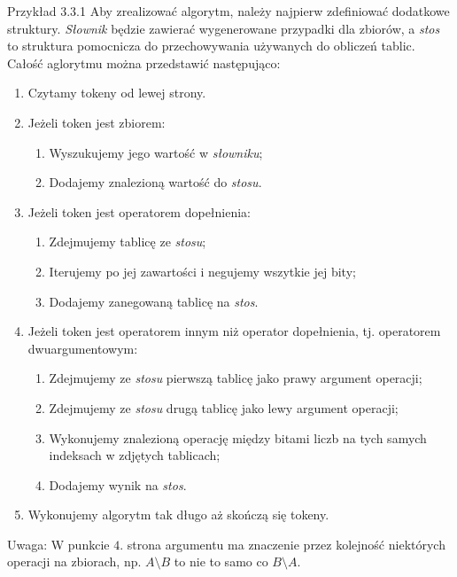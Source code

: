 \documentclass{SGGW-thesis}
\begin{document}
\begin{paragraph}{Przykład 3.3.1\label{ex:3.3.1}}
    Aby zrealizować algorytm, należy najpierw zdefiniować dodatkowe struktury. \emph{Słownik} będzie zawierać wygenerowane przypadki dla zbiorów, a \emph{stos} to struktura pomocnicza do przechowywania używanych do obliczeń tablic. Całość aglorytmu można przedstawić następująco:
    \begin{enumerate}
        \item Czytamy tokeny od lewej strony.
        \item Jeżeli token jest zbiorem:
        \begin{enumerate}
            \item Wyszukujemy jego wartość w \emph{słowniku};
            \item Dodajemy znalezioną wartość do \emph{stosu}.
        \end{enumerate}
        \item Jeżeli token jest operatorem dopełnienia:
        \begin{enumerate}
            \item Zdejmujemy tablicę ze \emph{stosu};
            \item Iterujemy po jej zawartości i negujemy wszytkie jej bity;
            \item Dodajemy zanegowaną tablicę na \emph{stos}.
        \end{enumerate}
        \item Jeżeli token jest operatorem innym niż operator dopełnienia, tj. operatorem dwuargumentowym:
        \begin{enumerate}
            \item Zdejmujemy ze \emph{stosu} pierwszą tablicę jako prawy argument operacji;
            \item Zdejmujemy ze \emph{stosu} drugą tablicę jako lewy argument operacji;
            \item Wykonujemy znalezioną operację między bitami liczb na tych samych indeksach w zdjętych tablicach;
            \item Dodajemy wynik na \emph{stos}.
        \end{enumerate}
        \item Wykonujemy algorytm tak długo aż skończą się tokeny.
    \end{enumerate}
\end{paragraph}

\begin{paragraph}{Uwaga:}
    W punkcie $4.$ strona argumentu ma znaczenie przez kolejność niektórych operacji na zbiorach, np. $A \setminus B$ to nie to samo co $B \setminus A$.
\end{paragraph}
\end{document}

